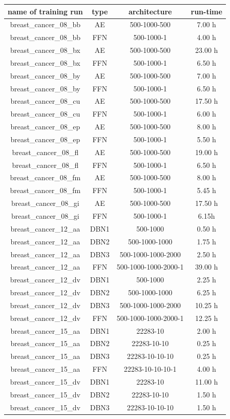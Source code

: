 \begin{table}
\begin{centering}
\begin{tabular}{|c|c|c|c|}
\hline 
name of training run & type & architecture & run-time\tabularnewline
\hline 
\hline 
breast\_cancer\_08\_bb & AE & 500-1000-500 & 7.00 h\tabularnewline
\hline 
breast\_cancer\_08\_bb & FFN & 500-1000-1 & 4.00 h\tabularnewline
\hline 
breast\_cancer\_08\_bx & AE & 500-1000-500 & 23.00 h\tabularnewline
\hline 
breast\_cancer\_08\_bx & FFN & 500-1000-1 & 6.50 h\tabularnewline
\hline 
breast\_cancer\_08\_by & AE & 500-1000-500 & 7.00 h\tabularnewline
\hline 
breast\_cancer\_08\_by & FFN & 500-1000-1 & 6.50 h\tabularnewline
\hline 
breast\_cancer\_08\_cu & AE & 500-1000-500 & 17.50 h\tabularnewline
\hline 
breast\_cancer\_08\_cu & FFN & 500-1000-1 & 6.00 h\tabularnewline
\hline 
breast\_cancer\_08\_ep & AE & 500-1000-500 & 8.00 h\tabularnewline
\hline 
breast\_cancer\_08\_ep & FFN & 500-1000-1 & 5.50 h\tabularnewline
\hline 
breast\_cancer\_08\_fl & AE & 500-1000-500 & 19.00 h\tabularnewline
\hline 
breast\_cancer\_08\_fl & FFN & 500-1000-1 & 6.50 h\tabularnewline
\hline 
breast\_cancer\_08\_fm & AE & 500-1000-500 & 8.00 h\tabularnewline
\hline 
breast\_cancer\_08\_fm & FFN & 500-1000-1 & 5.45 h\tabularnewline
\hline 
breast\_cancer\_08\_gi & AE & 500-1000-500 & 17.50 h\tabularnewline
\hline 
breast\_cancer\_08\_gi & FFN & 500-1000-1 & 6.15h\tabularnewline
\hline 
breast\_cancer\_12\_aa & DBN1 & 500-1000 & 0.50 h\tabularnewline
\hline 
breast\_cancer\_12\_aa & DBN2 & 500-1000-1000 & 1.75 h\tabularnewline
\hline 
breast\_cancer\_12\_aa & DBN3 & 500-1000-1000-2000 & 2.50 h\tabularnewline
\hline 
breast\_cancer\_12\_aa & FFN & 500-1000-1000-2000-1 & 39.00 h\tabularnewline
\hline 
breast\_cancer\_12\_dv & DBN1 & 500-1000 & 2.25 h\tabularnewline
\hline 
breast\_cancer\_12\_dv & DBN2 & 500-1000-1000 & 6.25 h\tabularnewline
\hline 
breast\_cancer\_12\_dv & DBN3 & 500-1000-1000-2000 & 10.25 h\tabularnewline
\hline 
breast\_cancer\_12\_dv & FFN & 500-1000-1000-2000-1 & 12.25 h\tabularnewline
\hline 
breast\_cancer\_15\_aa & DBN1 & 22283-10 & 2.00 h\tabularnewline
\hline 
breast\_cancer\_15\_aa & DBN2 & 22283-10-10 & 0.25 h\tabularnewline
\hline 
breast\_cancer\_15\_aa & DBN3 & 22283-10-10-10 & 0.25 h\tabularnewline
\hline 
breast\_cancer\_15\_aa & FFN & 22283-10-10-10-1 & 4.00 h\tabularnewline
\hline 
breast\_cancer\_15\_dv & DBN1 & 22283-10 & 11.00 h\tabularnewline
\hline 
breast\_cancer\_15\_dv & DBN2 & 22283-10-10 & 1.50 h\tabularnewline
\hline 
breast\_cancer\_15\_dv & DBN3 & 22283-10-10-10 & 1.50 h\tabularnewline

\end{tabular}
\end{centering}
\end{table}
